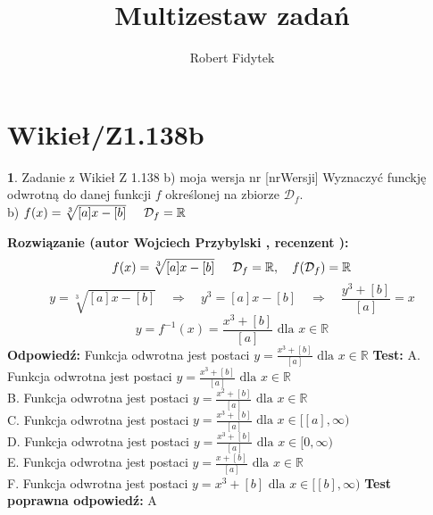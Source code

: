 \documentclass[12pt, a4paper]{article}
\title{Multizestaw zadań}
\author{Robert Fidytek}
\date{}
\theoremstyle{definition} %
\newtheorem{zad}{}
\newcommand{\kategoria}[1]{\section{#1}} %
\newcommand{\zadStart}[1]{\begin{zad}#1\newline} %
\newcommand{\zadStop}{\end{zad}}   %
\newcommand{\rozwStart}[2]{\noindent \textbf{Rozwiązanie (autor #1 , recenzent #2): }\newline} %
\newcommand{\rozwStop}{\newline}                                            %
\newcommand{\odpStart}{\noindent \textbf{Odpowiedź:}\newline}    %
\newcommand{\odpStop}{\newline}                                             %
\newcommand{\testStart}{\noindent \textbf{Test:}\newline} %
\newcommand{\testStop}{\newline} %
\newcommand{\kluczStart}{\noindent \textbf{Test poprawna odpowiedź:}\newline} %
\newcommand{\kluczStop}{\newline} %
\begin{document}
\maketitle


\kategoria{Wikieł/Z1.138b}
\zadStart{Zadanie z Wikieł Z 1.138 b) moja wersja nr [nrWersji]}
Wyznaczyć funckję odwrotną do danej funkcji $f$ określonej na zbiorze $\mathcal{D}_{f}$.\\
b) $f(x)=\sqrt[3]{[a]x-[b]}\hspace{5mm}\mathcal{D}_{f}=\mathbb{R}$
\zadStop
\rozwStart{Wojciech Przybylski}{}
$$f(x)=\sqrt[3]{[a]x-[b]}\hspace{5mm} \mathcal{D}_{f}=\mathbb{R}, \quad f(\mathcal{D}_{f})=\mathbb{R}$$
$$y=\sqrt[3]{[a]x-[b]} \quad \Rightarrow \quad y^{3}=[a]x-[b] \quad \Rightarrow \quad \frac{y^{3}+[b]}{[a]}=x$$
$$y=f^{-1}(x)=\frac{x^{3}+[b]}{[a]} \mbox{ dla } x\in \mathbb{R} $$
\rozwStop
\odpStart
Funkcja odwrotna jest postaci $y=\frac{x^{3}+[b]}{[a]} \mbox{ dla }x\in \mathbb{R}$
\odpStop
\testStart
A. Funkcja odwrotna jest postaci $y=\frac{x^{3}+[b]}{[a]} \mbox{ dla }x\in \mathbb{R}$\\
B. Funkcja odwrotna jest postaci $y=\frac{x^{2}+[b]}{[a]} \mbox{ dla }x\in \mathbb{R}$\\
C. Funkcja odwrotna jest postaci $y=\frac{x^{3}+[b]}{[a]} \mbox{ dla }x\in[[a],\infty)$\\
D. Funkcja odwrotna jest postaci $y=\frac{x^{3}+[b]}{[a]} \mbox{ dla }x\in[0,\infty)$\\
E. Funkcja odwrotna jest postaci $y=\frac{x+[b]}{[a]} \mbox{ dla }x\in \mathbb{R}$\\
F. Funkcja odwrotna jest postaci $y=x^{3}+[b]\mbox{ dla }x\in[[b],\infty)$
\testStop
\kluczStart
A
\kluczStop
\end{document}
